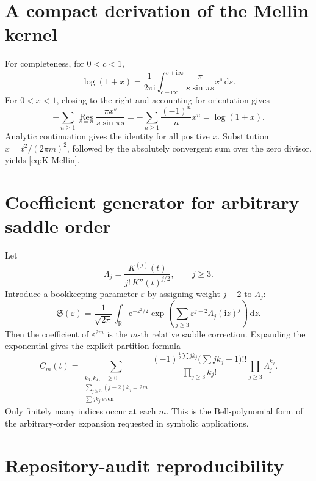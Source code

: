 \documentclass[11pt,oneside]{article}
\theoremstyle{definition}
\theoremstyle{remark}
\newcommand{\R}{\mathbb R}
\newcommand{\e}{\mathrm e}
\newcommand{\ii}{\mathrm i}
\newcommand{\dd}{\,\mathrm d}
\begin{document}
\appendix

\section{A compact derivation of the Mellin kernel}

For completeness, for \(0<c<1\),
\[
 \log(1+x)
 =\frac1{2\pi\ii}
  \int_{c-\ii\infty}^{c+\ii\infty}
  \frac{\pi}{s\sin\pi s}x^s\dd s.
\]
For \(0<x<1\), closing to the right and accounting for orientation gives
\[
 -\sum_{n\geq1}\operatorname*{Res}_{s=n}
 \frac{\pi x^s}{s\sin\pi s}
 =-\sum_{n\geq1}\frac{(-1)^n}{n}x^n
 =\log(1+x).
\]
Analytic continuation gives the identity for all positive \(x\).
Substitution \(x=t^2/(2\pi m)^2\), followed by the absolutely convergent
sum over the zero divisor, yields \eqref{eq:K-Mellin}.

\section{Coefficient generator for arbitrary saddle order}

Let
\[
 \Lambda_j=\frac{K^{(j)}(t)}{j!\,K''(t)^{j/2}},
 \qquad j\geq3.
\]
Introduce a bookkeeping parameter \(\varepsilon\) by assigning weight
\(j-2\) to \(\Lambda_j\):
\[
 \mathfrak S(\varepsilon)
 =
 \frac1{\sqrt{2\pi}}\int_\R\e^{-z^2/2}
 \exp\!\left(
  \sum_{j\geq3}
   \varepsilon^{j-2}\Lambda_j(\ii z)^j
 \right)\dd z.
\]
Then the coefficient of \(\varepsilon^{2m}\) is the \(m\)-th relative
saddle correction.  Expanding the exponential gives the explicit partition
formula
\[
 C_m(t)=
 \sum_{\substack{k_3,k_4,\ldots\geq0\\
                 \sum_{j\geq3}(j-2)k_j=2m\\
                 \sum j k_j\ \mathrm{even}}}
 \frac{(-1)^{\frac12\sum j k_j}
       \bigl(\sum j k_j-1\bigr)!!}
      {\prod_{j\geq3}k_j!}
 \prod_{j\geq3}\Lambda_j^{k_j}.
\]
Only finitely many indices occur at each \(m\).  This is the Bell-polynomial
form of the arbitrary-order expansion requested in symbolic applications.

\section{Repository-audit reproducibility}
\end{document}
